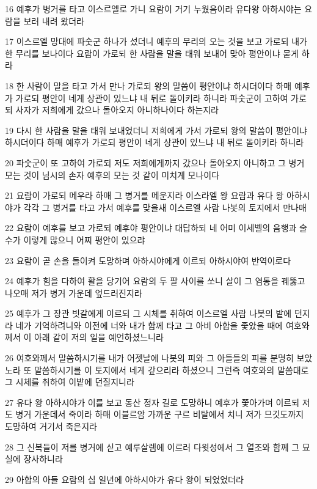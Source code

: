 \par 16 예후가 병거를 타고 이스르엘로 가니 요람이 거기 누웠음이라 유다왕 아하시야는 요람을 보러 내려 왔더라
\par 17 이스르엘 망대에 파숫군 하나가 섰더니 예후의 무리의 오는 것을 보고 가로되 내가 한 무리를 보나이다 요람이 가로되 한 사람을 말을 태워 보내어 맞아 평안이냐 묻게 하라
\par 18 한 사람이 말을 타고 가서 만나 가로되 왕의 말씀이 평안이냐 하시더이다 하매 예후가 가로되 평안이 네게 상관이 있느냐 내 뒤로 돌이키라 하니라 파숫군이 고하여 가로되 사자가 저희에게 갔으나 돌아오지 아니하나이다 하는지라
\par 19 다시 한 사람을 말을 태워 보내었더니 저희에게 가서 가로되 왕의 말씀이 평안이냐 하시더이다 하매 예후가 가로되 평안이 네게 상관이 있느냐 내 뒤로 돌이키라 하니라
\par 20 파숫군이 또 고하여 가로되 저도 저희에게까지 갔으나 돌아오지 아니하고 그 병거 모는 것이 님시의 손자 예후의 모는 것 같이 미치게 모나이다
\par 21 요람이 가로되 메우라 하매 그 병거를 메운지라 이스라엘 왕 요람과 유다 왕 아하시야가 각각 그 병거를 타고 가서 예후를 맞을새 이스르엘 사람 나봇의 토지에서 만나매
\par 22 요람이 예후를 보고 가로되 예후야 평안이냐 대답하되 네 어미 이세벨의 음행과 술수가 이렇게 많으니 어찌 평안이 있으랴
\par 23 요람이 곧 손을 돌이켜 도망하며 아하시야에게 이르되 아하시야여 반역이로다
\par 24 예후가 힘을 다하여 활을 당기어 요람의 두 팔 사이를 쏘니 살이 그 염통을 꿰뚫고 나오매 저가 병거 가운데 엎드러진지라
\par 25 예후가 그 장관 빗갈에게 이르되 그 시체를 취하여 이스르엘 사람 나봇의 밭에 던지라 네가 기억하려니와 이전에 너와 내가 함께 타고 그 아비 아합을 좇았을 때에 여호와께서 이 아래 같이 저의 일을 예언하셨느니라
\par 26 여호와께서 말씀하시기를 내가 어젯날에 나봇의 피와 그 아들들의 피를 분명히 보았노라 또 말씀하시기를 이 토지에서 네게 갚으리라 하셨으니 그런즉 여호와의 말씀대로 그 시체를 취하여 이밭에 던질지니라
\par 27 유다 왕 아하시야가 이를 보고 동산 정자 길로 도망하니 예후가 쫓아가며 이르되 저도 병거 가운데서 죽이라 하매 이블르암 가까운 구르 비탈에서 치니 저가 므깃도까지 도망하여 거기서 죽은지라
\par 28 그 신복들이 저를 병거에 싣고 예루살렘에 이르러 다윗성에서 그 열조와 함께 그 묘실에 장사하니라
\par 29 아합의 아들 요람의 십 일년에 아하시야가 유다 왕이 되었었더라
